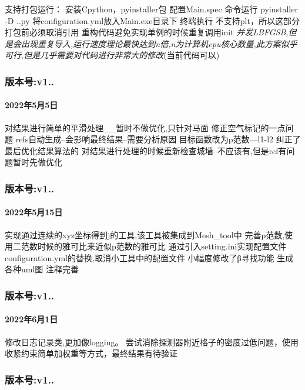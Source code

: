 支持打包运行： 安装\+Cpython，pyinstaller包 配置\+Main.\+spec 命令运行 pyinstaller -\/D ..py 将configuration.\+yml放入\+Main.\+exe目录下 终端执行 不支持plt，所以这部分打包前必须取消引用 重构代码避免实现单例的时候重复调用init {\itshape 并发\+L\+B\+F\+G\+SB,但是会出现重复导入,运行速度理论最快达到n倍,n为计算机cpu核心数量,此方案似乎可行,但是几乎需要对代码进行非常大的修改}(当前代码可以)

\subsubsection*{版本号\+:v1..}

\paragraph*{2022年5月5日}

对结果进行简单的平滑处理\+\_\+\+\_\+暂时不做优化,只针对马面 修正空气标记的一点问题 refs自动生成--会影响最终结果--需要分析原因 目标函数改为p范数---l1-\/l2 纠正了最后优化结果算法的 对结果进行处理的时候重新检查城墙--不应该有,但是ref有问题暂时先做优化

\subsubsection*{版本号\+:v1..}

\paragraph*{2022年5月15日}

实现通过连续的xyz坐标得到j的工具,该工具被集成到\+Mesh\+\_\+tool中 完善p范数,使用二范数时候的雅可比来近似p范数的雅可比 通过引入setting.\+ini实现配置文件configuration.\+yml的替换,取消小工具中的配置文件 小幅度修改了β寻找功能 生成各种uml图 注释完善

\subsubsection*{版本号\+:v1..}

\paragraph*{2022年6月1日}

修改日志记录类,更加像logging。 尝试消除探测器附近格子的密度过低问题，使用收紧约束简单加权重等方式，最终结果有待验证

\subsubsection*{版本号\+:v1..}

